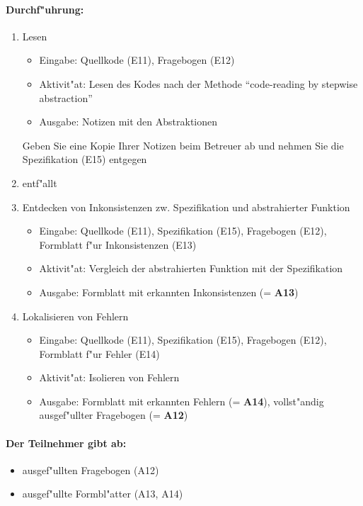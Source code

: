 \paragraph{Durchf"uhrung:} 
\begin{enumerate}
	\item Lesen
	\begin{itemize}
		\item Eingabe: Quellkode (E11), Fragebogen (E12)
		\item Aktivit"at: Lesen des Kodes nach der Methode "`code-reading by 
			stepwise abstraction"'
		\item Ausgabe: Notizen mit den Abstraktionen
	\end{itemize}
	Geben Sie eine Kopie Ihrer Notizen beim Betreuer ab und nehmen Sie die 
	Spezifikation (E15) entgegen
	\item entf"allt
	\item Entdecken von Inkonsistenzen zw. Spezifikation und abstrahierter 
		Funktion
	\begin{itemize}
		\item Eingabe: Quellkode (E11), Spezifikation (E15), Fragebogen (E12),
			Formblatt f"ur Inkonsistenzen (E13)
		\item Aktivit"at: Vergleich der abstrahierten Funktion mit der
			Spezifikation 
		\item Ausgabe: Formblatt mit erkannten Inkonsistenzen (= {\bf A13})
	\end{itemize}
	\item Lokalisieren von Fehlern
	\begin{itemize}
		\item Eingabe: Quellkode (E11), Spezifikation (E15), Fragebogen (E12),
			Formblatt f"ur Fehler (E14)
		\item Aktivit"at: Isolieren von Fehlern
		\item Ausgabe: Formblatt mit erkannten Fehlern (= {\bf A14}), 
			vollst"andig ausgef"ullter Fragebogen (= {\bf A12})
	\end{itemize}
\end{enumerate}

\paragraph{Der Teilnehmer gibt ab:}  
\begin{itemize}
	\item ausgef"ullten Fragebogen (A12)
	\item ausgef"ullte Formbl"atter  (A13, A14)
\end{itemize}

